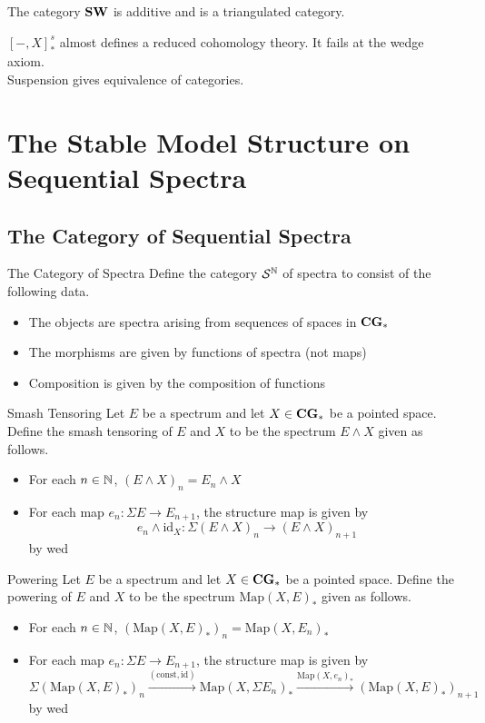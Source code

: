\documentclass[a4paper]{article}
\begin{document}
\begin{prp}{}{} The category $\bold{SW}$ is additive and is a triangulated category. 
\end{prp}

$[-,X]_\ast^s$ almost defines a reduced cohomology theory. It fails at the wedge axiom. \\
Suspension gives equivalence of categories. 

\pagebreak
\section{The Stable Model Structure on Sequential Spectra}
\subsection{The Category of Sequential Spectra}
\begin{defn}{The Category of Spectra}{} Define the category $\mathcal{S}^{\mathbb{N}}$ of spectra to consist of the following data. 
\begin{itemize}
\item The objects are spectra arising from sequences of spaces in $\bold{CG}_\ast$
\item The morphisms are given by functions of spectra (not maps)
\item Composition is given by the composition of functions
\end{itemize}
\end{defn}

\begin{defn}{Smash Tensoring}{} Let $E$ be a spectrum and let $X\in\bold{CG}_\ast$ be a pointed space. Define the smash tensoring of $E$ and $X$ to be the spectrum $E\wedge X$ given as follows. 
\begin{itemize}
\item For each $n\in\mathbb{N}$, $(E\wedge X)_n=E_n\wedge X$
\item For each map $e_n:\Sigma E\to E_{n+1}$, the structure map is given by $$e_n\wedge\text{id}_X:\Sigma(E\wedge X)_n\to(E\wedge X)_{n+1}$$ by wed
\end{itemize}
\end{defn}

\begin{defn}{Powering}{} Let $E$ be a spectrum and let $X\in\bold{CG}_\ast$ be a pointed space. Define the powering of $E$ and $X$ to be the spectrum $\text{Map}(X,E)_\ast$ given as follows. 
\begin{itemize}
\item For each $n\in\mathbb{N}$, $(\text{Map}(X,E)_\ast)_n=\text{Map}(X,E_n)_\ast$
\item For each map $e_n:\Sigma E\to E_{n+1}$, the structure map is given by $$\Sigma(\text{Map}(X,E)_\ast)_n\overset{(\text{const},\text{id})}{\longrightarrow}\text{Map}(X,\Sigma E_n)_\ast\overset{\text{Map}(X,e_n)_\ast}{\longrightarrow}(\text{Map}(X,E)_\ast)_{n+1}$$ by wed
\end{itemize}
\end{defn}
\end{document}
